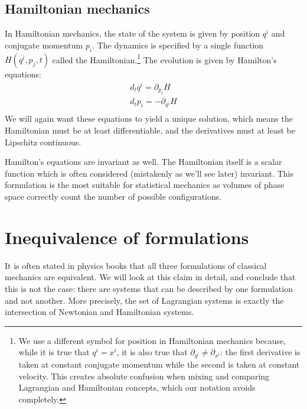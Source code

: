 \subsection{Hamiltonian mechanics}

In Hamiltonian mechanics, the state of the system is given by position $q^i$ and conjugate momentum $p_i$. The dynamics is specified by a single function $H(q^i, p_j, t)$ called the Hamiltonian.\footnote{We use a different symbol for position in Hamiltonian mechanics because, while it is true that $q^i = x^i$, it is also true that $\partial_{q^i} \neq \partial_{x^i}$: the first derivative is taken at constant conjugate momentum while the second is taken at constant velocity. This creates absolute confusion when mixing and comparing Lagrangian and Hamiltonian concepts, which our notation avoids completely.} The evolution is given by Hamilton's equations:
\begin{equation}\label{rp-cm-HamiltonEq}
	\begin{aligned}
		d_t q^i = \partial_{p_i} H \\
		d_t p_i = - \partial_{q^i} H \\
	\end{aligned}
\end{equation}
We will again want these equations to yield a unique solution, which means the Hamiltonian must be at least differentiable, and the derivatives must at least be Lipschitz continuous.

Hamilton's equations are invariant as well. The Hamiltonian itself is a scalar function which is often considered (mistakenly as we'll see later) invariant. This formulation is the most suitable for statistical mechanics as volumes of phase space correctly count the number of possible configurations.

\section{Inequivalence of formulations}

It is often stated in physics books that all three formulations of classical mechanics are equivalent. We will look at this claim in detail, and conclude that this is not the case: there are systems that can be described by one formulation and not another. More precisely, the set of Lagrangian systems is exactly the intersection of Newtonian and Hamiltonian systems.

